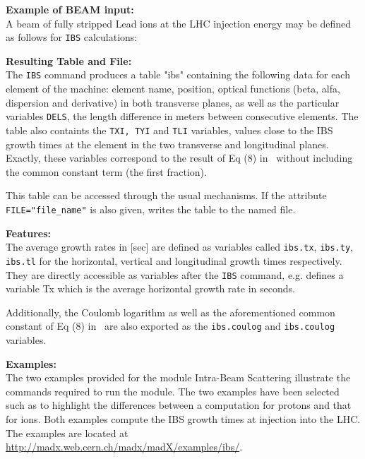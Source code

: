 \textbf{Example of BEAM input:}\\
A beam of fully stripped Lead ions at the LHC injection energy may be
defined as follows for \texttt{IBS} calculations: 


\textbf{Resulting Table and File:} \\
The \texttt{IBS} command produces a table "ibs" containing the following
data for each element of the machine: element name, position, optical functions
(beta, alfa, dispersion and derivative) in both transverse planes, as
well as the particular variables \texttt{DELS}, the length difference in
meters between consecutive elements. The table also containts the \texttt{TXI, TYI}
and \texttt{TLI} variables, values close to the IBS growth times at the element in
the two transverse and longitudinal planes. Exactly, these variables correspond to
the result of Eq (8) in~\cite{antoniou-zimmermann2012} without including the common
constant term (the first fraction).

This table can be accessed through the usual mechanisms. If the
attribute \texttt{FILE="file\_name"} is also given, \madx writes the
table to the named file.  


\textbf{Features:} \\
The average growth rates in [sec] are defined as variables called
\texttt{ibs.tx}, \texttt{ibs.ty}, \texttt{ibs.tl} for the horizontal,
vertical and longitudinal growth times respectively. They are directly
accessible as variables after the \texttt{IBS} command, e.g.
defines a variable Tx which is the average horizontal growth rate in seconds.

Additionally, the Coulomb logarithm as well as the aforementioned common
constant of Eq (8) in~\cite{antoniou-zimmermann2012} are also exported as
the \texttt{ibs.coulog} and \texttt{ibs.coulog} variables.


\textbf{Examples:} \\
The two examples provided for the module Intra-Beam Scattering
illustrate the commands required to run the module. The two examples
have been selected such as to highlight the differences between a
computation for protons and that for ions. Both examples compute the IBS
growth times at injection into the LHC.\\
The examples are located at
\href{http://madx.web.cern.ch/madx/madX/examples/ibs/}{http://madx.web.cern.ch/madx/madX/examples/ibs/}. 


